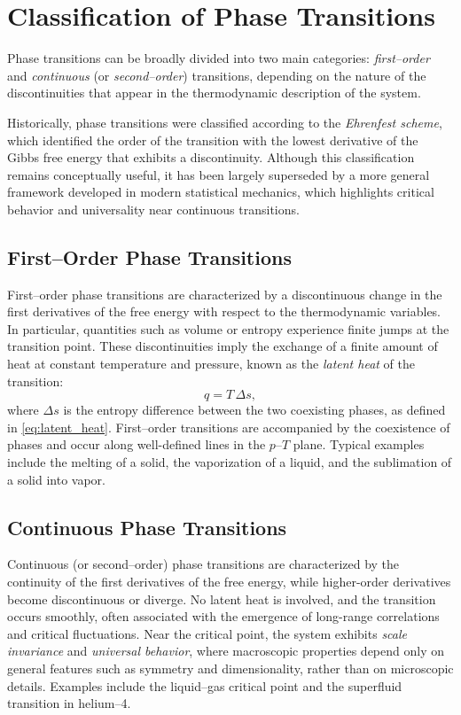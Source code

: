 \section{Classification of Phase Transitions}

Phase transitions can be broadly divided into two main categories: \textit{first--order} and \textit{continuous} (or \textit{second--order}) transitions, depending on the nature of the discontinuities that appear in the thermodynamic description of the system.

Historically, phase transitions were classified according to the \textit{Ehrenfest scheme}, which identified the order of the transition with the lowest derivative of the Gibbs free energy that exhibits a discontinuity.
Although this classification remains conceptually useful, it has been largely superseded by a more general framework developed in modern statistical mechanics, which highlights critical behavior and universality near continuous transitions.

\subsection{First--Order Phase Transitions}
First--order phase transitions are characterized by a discontinuous change in the first derivatives of the free energy with respect to the thermodynamic variables.
In particular, quantities such as volume or entropy experience finite jumps at the transition point.
These discontinuities imply the exchange of a finite amount of heat at constant temperature and pressure, known as the \textit{latent heat} of the transition:
\[
    q = T \, \Delta s,
\]
where \(\Delta s\) is the entropy difference between the two coexisting phases, as defined in \eqref{eq:latent_heat}.
First--order transitions are accompanied by the coexistence of phases and occur along well-defined lines in the \(p\)--\(T\) plane.
Typical examples include the melting of a solid, the vaporization of a liquid, and the sublimation of a solid into vapor.

\subsection{Continuous Phase Transitions}
Continuous (or second--order) phase transitions are characterized by the continuity of the first derivatives of the free energy, while higher-order derivatives become discontinuous or diverge.
No latent heat is involved, and the transition occurs smoothly, often associated with the emergence of long-range correlations and critical fluctuations.
Near the critical point, the system exhibits \textit{scale invariance} and \textit{universal behavior}, where macroscopic properties depend only on general features such as symmetry and dimensionality, rather than on microscopic details.
Examples include the liquid--gas critical point and the superfluid transition in helium--4.

